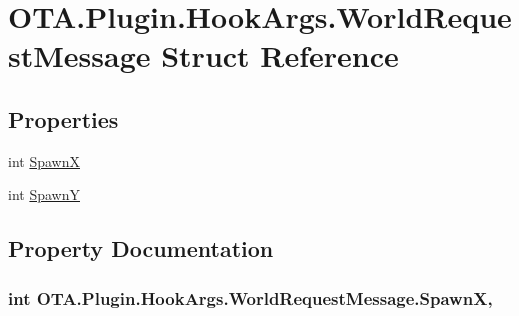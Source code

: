 \hypertarget{struct_o_t_a_1_1_plugin_1_1_hook_args_1_1_world_request_message}{}\section{O\+T\+A.\+Plugin.\+Hook\+Args.\+World\+Request\+Message Struct Reference}
\label{struct_o_t_a_1_1_plugin_1_1_hook_args_1_1_world_request_message}
\subsection*{Properties}
\begin{DoxyCompactItemize}
\item 
int \hyperlink{struct_o_t_a_1_1_plugin_1_1_hook_args_1_1_world_request_message_a86da809da33ff7fe0de690b5fae4487b}{Spawn\+X}
\item 
int \hyperlink{struct_o_t_a_1_1_plugin_1_1_hook_args_1_1_world_request_message_acd093709cbbef8c4d0e0bc2d2bd13b46}{Spawn\+Y}
\end{DoxyCompactItemize}


\subsection{Property Documentation}
\hypertarget{struct_o_t_a_1_1_plugin_1_1_hook_args_1_1_world_request_message_a86da809da33ff7fe0de690b5fae4487b}{}
\subsubsection[{Spawn\+X}]{\setlength{\rightskip}{0pt plus 5cm}int O\+T\+A.\+Plugin.\+Hook\+Args.\+World\+Request\+Message.\+Spawn\+X\hspace{0.3cm}{\ttfamily [get]}, {\ttfamily [set]}}\label{struct_o_t_a_1_1_plugin_1_1_hook_args_1_1_world_request_message_a86da809da33ff7fe0de690b5fae4487b}
\hypertarget{struct_o_t_a_1_1_plugin_1_1_hook_args_1_1_world_request_message_acd093709cbbef8c4d0e0bc2d2bd13b46}{}

